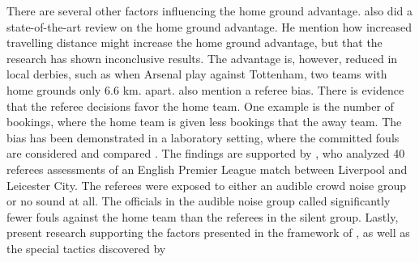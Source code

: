 There are several other factors influencing the home ground advantage. \citet{bib:pollard-2008} also did a state-of-the-art review on the home ground advantage. He mention how increased travelling distance might increase the home ground advantage, but that the research has shown inconclusive results. The advantage is, however, reduced in local derbies, such as when Arsenal play against Tottenham, two teams with home grounds only $6.6$ km. apart. \citet{bib:pollard-2008} also mention a referee bias. There is evidence that the referee decisions favor the home team. One example is the number of bookings, where the home team is given less bookings that the away team. The bias has been demonstrated in a laboratory setting, where the committed fouls are considered and compared \citep{bib:pollard-2008}. The findings are supported by \citet{bib:nevill-ballmer-williams-2002}, who analyzed 40 referees assessments of an English Premier League match between Liverpool and Leicester City. The referees were exposed to either an audible crowd noise group or no sound at all. The officials in the audible noise group called significantly fewer fouls against the home team than the referees in the silent group. Lastly, \citet{bib:pollard-2008} present research supporting the factors presented in the framework of \citet{bib:carron-loughead-bray-2005}, as well as the special tactics discovered by \citet{bib:bialkowski-lucey-carr-yue-sridharan-matthews-2014}

